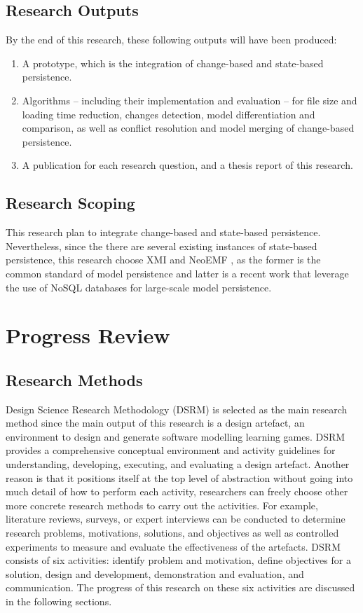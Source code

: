 \documentclass[12pt, a4paper]{report} \usepackage[titletoc]{appendix}
\begin{document}
\section{Research Outputs}
\label{sec:research_outputs}
By the end of this research, these following outputs will have been produced:
\begin{enumerate}
	\item A prototype, which is the integration of change-based and state-based persistence.
	\item Algorithms -- including their implementation and evaluation -- for file size and loading time reduction, changes detection, model differentiation and comparison, as well as conflict resolution and model merging of change-based persistence.
	\item A publication for each research question, and a thesis report of this research. 
\end{enumerate}


\section{Research Scoping}
\label{sec:research_scoping}
This research plan to integrate change-based and state-based persistence. Nevertheless, since the there are several existing instances of state-based persistence,  this research choose XMI and NeoEMF \cite{daniel2016neoemf}, as the former is the common standard of  model persistence and latter is a recent work that leverage the use of NoSQL databases for large-scale model persistence. 

\chapter{Progress Review}
\label{ch:progress_review}

\section{Research Methods}
\label{sec:research_methods}
Design Science Research Methodology (DSRM) is selected as the main research method since the main output of this research is a design artefact, an environment to design and generate software modelling learning games. DSRM provides a comprehensive conceptual environment and activity guidelines for understanding, developing, executing, and evaluating a design artefact. Another reason is that it positions itself at the top level of abstraction without going into much detail of how to perform each activity, researchers can freely choose other more concrete research methods to carry out the activities. For example, literature reviews, surveys, or expert interviews can be conducted to determine research problems, motivations, solutions, and objectives as well as controlled experiments to measure and evaluate the effectiveness of the artefacts. DSRM consists of six activities: identify problem and motivation, define objectives for a solution, design and development, demonstration and evaluation, and communication. The progress of this research on these six activities are discussed in the following sections.
\end{document}
